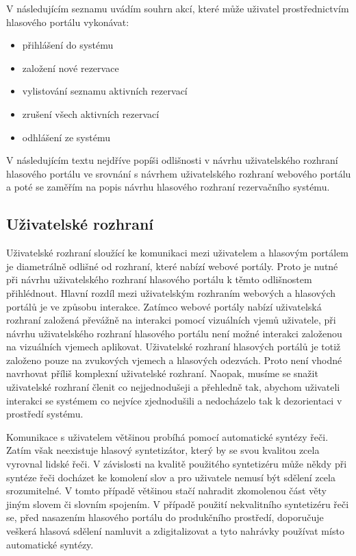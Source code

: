 \documentclass[ing,male,java,dept460,twoside]{diploma}						%
\begin{document}
V následujícím seznamu uvádím souhrn akcí, které může uživatel prostřednictvím hlasového portálu vykonávat:

\begin{itemize}
\item přihlášení do systému
\item založení nové rezervace
\item vylistování seznamu aktivních rezervací
\item zrušení všech aktivních rezervací
\item odhlášení ze systému
\end{itemize}

V následujícím textu nejdříve popíši odlišnosti v návrhu uživatelského rozhraní hlasového portálu ve srovnání s návrhem uživatelského rozhraní webového portálu a poté se zaměřím na popis návrhu hlasového rozhraní rezervačního systému.

\subsection{Uživatelské rozhraní}
Uživatelské rozhraní sloužící ke komunikaci mezi uživatelem a hlasovým portálem je diametrálně odlišné od rozhraní, které nabízí webové portály. Proto je nutné při návrhu uživatelského rozhraní hlasového portálu k těmto odlišnostem přihlédnout. Hlavní rozdíl mezi uživatelským rozhraním webových a hlasových portálů je ve způsobu interakce. Zatímco webové portály nabízí uživatelská rozhraní založená převážně na interakci pomocí vizuálních vjemů uživatele, při návrhu uživatelského rozhraní hlasového portálu není možné interakci založenou na vizuálních vjemech aplikovat. Uživatelské rozhraní hlasových portálů je totiž založeno pouze na zvukových vjemech a hlasových odezvách. Proto není vhodné navrhovat příliš komplexní uživatelské rozhraní. Naopak, musíme se snažit uživatelské rozhraní členit co nejjednodušeji a přehledně tak, abychom uživateli interakci se systémem co nejvíce zjednodušili a nedocházelo tak k dezorientaci v prostředí systému.

Komunikace s uživatelem většinou probíhá pomocí automatické syntézy řeči. Zatím však neexistuje hlasový syntetizátor, který by se svou kvalitou zcela vyrovnal lidské řeči. V závislosti na kvalitě použitého syntetizéru může někdy při syntéze řeči docházet ke komolení slov a pro uživatele nemusí být sdělení zcela srozumitelné. V tomto případě většinou stačí nahradit zkomolenou část věty jiným slovem či slovním spojením. V případě použití nekvalitního syntetizéru řeči se, před nasazením hlasového portálu do produkčního prostředí, doporučuje veškerá hlasová sdělení namluvit a zdigitalizovat a tyto nahrávky používat místo automatické syntézy.
\end{document}

